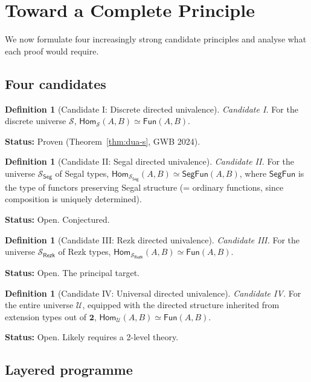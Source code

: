 \documentclass[12pt]{article}
\theoremstyle{definition}
\newtheorem{definition}[theorem]{Definition}
\theoremstyle{remark}
\newcommand{\U}{\mathcal{U}}
\newcommand{\Hom}{\mathsf{Hom}}
\newcommand{\Fun}{\mathsf{Fun}}
\newcommand{\eqv}{\simeq}
\newcommand{\twoI}{\mathbf{2}}
\begin{document}
\section{Toward a Complete Principle}\label{sec:complete}

We now formulate four increasingly strong candidate principles and analyse what each proof would require.

\subsection{Four candidates}

\begin{definition}[Candidate I: Discrete directed univalence]\label{def:cand-i}
\emph{Candidate I\@.} For the discrete universe $\mathcal{S}$, $\Hom_{\mathcal{S}}(A,B) \eqv \Fun(A,B)$.

\textbf{Status:} Proven (Theorem~\ref{thm:dua-s}, GWB 2024).
\end{definition}

\begin{definition}[Candidate II: Segal directed univalence]\label{def:cand-ii}
\emph{Candidate II\@.} For the universe $\mathcal{S}_{\mathsf{Seg}}$ of Segal types, $\Hom_{\mathcal{S}_{\mathsf{Seg}}}(A,B) \eqv \mathsf{SegFun}(A,B)$, where $\mathsf{SegFun}$ is the type of functors preserving Segal structure (= ordinary functions, since composition is uniquely determined).

\textbf{Status:} Open. Conjectured.
\end{definition}

\begin{definition}[Candidate III: Rezk directed univalence]\label{def:cand-iii}
\emph{Candidate III\@.} For the universe $\mathcal{S}_{\mathsf{Rezk}}$ of Rezk types, $\Hom_{\mathcal{S}_{\mathsf{Rezk}}}(A,B) \eqv \Fun(A,B)$.

\textbf{Status:} Open. The principal target.
\end{definition}

\begin{definition}[Candidate IV: Universal directed univalence]\label{def:cand-iv}
\emph{Candidate IV\@.} For the entire universe $\U$, equipped with the directed structure inherited from extension types out of $\twoI$, $\Hom_{\U}(A,B) \eqv \Fun(A,B)$.

\textbf{Status:} Open. Likely requires a 2-level theory.
\end{definition}

\subsection{Layered programme}
\end{document}
